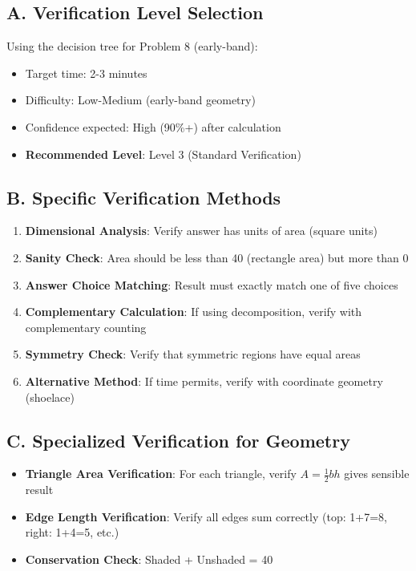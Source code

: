 \documentclass[11pt]{article}
\begin{document}
\begin{verificationbox}
\subsection*{A. Verification Level Selection}

Using the decision tree for Problem 8 (early-band):
\begin{itemize}
    \item Target time: 2-3 minutes
    \item Difficulty: Low-Medium (early-band geometry)
    \item Confidence expected: High (90\%+) after calculation
    \item \textbf{Recommended Level}: Level 3 (Standard Verification)
\end{itemize}

\subsection*{B. Specific Verification Methods}
\begin{enumerate}
    \item \textbf{Dimensional Analysis}: Verify answer has units of area (square units)
    \item \textbf{Sanity Check}: Area should be less than 40 (rectangle area) but more than 0
    \item \textbf{Answer Choice Matching}: Result must exactly match one of five choices
    \item \textbf{Complementary Calculation}: If using decomposition, verify with complementary counting
    \item \textbf{Symmetry Check}: Verify that symmetric regions have equal areas
    \item \textbf{Alternative Method}: If time permits, verify with coordinate geometry (shoelace)
\end{enumerate}

\subsection*{C. Specialized Verification for Geometry}
\begin{itemize}[leftmargin=*]
    \item \textbf{Triangle Area Verification}: For each triangle, verify $A = \frac{1}{2}bh$ gives sensible result
    \item \textbf{Edge Length Verification}: Verify all edges sum correctly (top: 1+7=8, right: 1+4=5, etc.)
    \item \textbf{Conservation Check}: Shaded + Unshaded = 40
\end{itemize}


\end{verificationbox}
\end{document}
